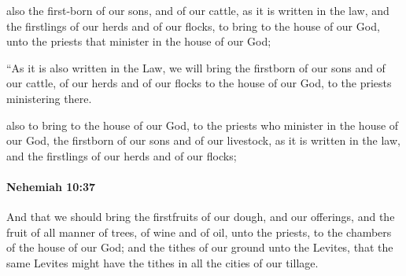			\begin{versebox}
					\item[BHS] 
					\item[LXX] 
					\item[ASV] also the first-born of our sons, and of our cattle, as it is written in the law, and the firstlings of our herds and of our flocks, to bring to the house of our God, unto the priests that minister in the house of our God;
					\item[NIV] “As it is also written in the Law, we will bring the firstborn of our sons and of our cattle, of our herds and of our flocks to the house of our God, to the priests ministering there.
					\item[NRSV] also to bring to the house of our God, to the priests who minister in the house of our God, the firstborn of our sons and of our livestock, as it is written in the law, and the firstlings of our herds and of our flocks;
			\end{versebox}

		\paragraph{Nehemiah 10:37} %
			\label{NEHEMIAH-10-37}

			And that we should bring the firstfruits of our dough, and our offerings, and the fruit of all manner of trees, of wine and of oil, unto the priests, to the chambers of the house of our God; and the tithes of our ground unto the Levites, that the same Levites might have the tithes in all the cities of our tillage.

